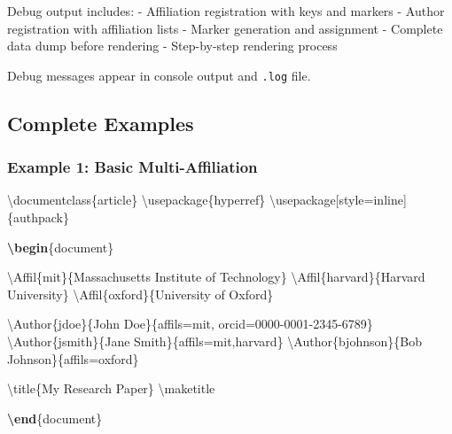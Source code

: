 \documentclass[
]{article}
\newenvironment{Shaded}{}{}
\newcommand{\BuiltInTok}[1]{#1}
\newcommand{\ExtensionTok}[1]{#1}
\newcommand{\FunctionTok}[1]{\textcolor[rgb]{0.02,0.16,0.49}{#1}}
\newcommand{\KeywordTok}[1]{\textcolor[rgb]{0.00,0.44,0.13}{\textbf{#1}}}
\newcommand{\NormalTok}[1]{#1}
\begin{document}
Debug output includes: - Affiliation registration with keys and markers
- Author registration with affiliation lists - Marker generation and
assignment - Complete data dump before rendering - Step-by-step
rendering process

Debug messages appear in console output and \texttt{.log} file.

\hypertarget{complete-examples}{%
\subsection{Complete Examples}\label{complete-examples}}

\hypertarget{example-1-basic-multi-affiliation}{%
\subsubsection{Example 1: Basic
Multi-Affiliation}\label{example-1-basic-multi-affiliation}}

\begin{Shaded}
\begin{Highlighting}[]
\BuiltInTok{\textbackslash{}documentclass}\NormalTok{\{}\ExtensionTok{article}\NormalTok{\}}
\BuiltInTok{\textbackslash{}usepackage}\NormalTok{\{}\ExtensionTok{hyperref}\NormalTok{\}}
\BuiltInTok{\textbackslash{}usepackage}\NormalTok{[style=inline]\{}\ExtensionTok{authpack}\NormalTok{\}}

\KeywordTok{\textbackslash{}begin}\NormalTok{\{}\ExtensionTok{document}\NormalTok{\}}

\FunctionTok{\textbackslash{}Affil}\NormalTok{\{mit\}\{Massachusetts Institute of Technology\}}
\FunctionTok{\textbackslash{}Affil}\NormalTok{\{harvard\}\{Harvard University\}}
\FunctionTok{\textbackslash{}Affil}\NormalTok{\{oxford\}\{University of Oxford\}}

\FunctionTok{\textbackslash{}Author}\NormalTok{\{jdoe\}\{John Doe\}\{affils=mit, orcid=0000{-}0001{-}2345{-}6789\}}
\FunctionTok{\textbackslash{}Author}\NormalTok{\{jsmith\}\{Jane Smith\}\{affils=mit,harvard\}}
\FunctionTok{\textbackslash{}Author}\NormalTok{\{bjohnson\}\{Bob Johnson\}\{affils=oxford\}}

\FunctionTok{\textbackslash{}title}\NormalTok{\{My Research Paper\}}
\FunctionTok{\textbackslash{}maketitle}

\KeywordTok{\textbackslash{}end}\NormalTok{\{}\ExtensionTok{document}\NormalTok{\}}
\end{Highlighting}
\end{Shaded}
\end{document}
